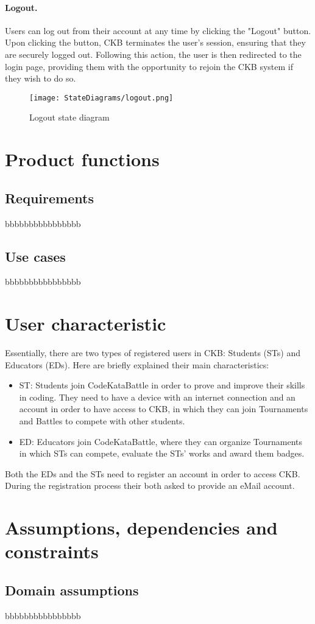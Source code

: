 \paragraph{Logout.}
Users can log out from their account at any time by clicking the "Logout" button. Upon clicking the button, CKB terminates the user's session, ensuring that they are securely logged out. Following this action, the user is then redirected to the login page, providing them with the opportunity to rejoin the CKB system if they wish to do so. 

\begin{figure}[H]
    \begin{center}
        \texttt{[image: StateDiagrams/logout.png]}
        \caption{Logout state diagram}
        \label{fig:logout_sd}%
    \end{center}
\end{figure}

\section{Product functions}
\label{sec:product_functions}%

\subsection{Requirements}
\label{subsec:requirements}%
bbbbbbbbbbbbbbbb

\subsection{Use cases}
\label{subsec:use_cases}%
bbbbbbbbbbbbbbbb

\section{User characteristic}
\label{sec:user_characteristic}%
Essentially, there are two types of registered users in CKB: Students (STs) and Educators (EDs). Here are briefly explained their main characteristics:
\begin{itemize}
    \item ST: Students join CodeKataBattle in order to prove and improve their skills in coding. They need to have a device with an internet connection and an account in order to have access to CKB, in which they can join Tournaments and Battles to compete with other students.  
    \item ED: Educators join CodeKataBattle, where they can organize Tournaments in which STs can compete, evaluate the STs’ works and award them badges. 
\end{itemize}
Both the EDs and the STs need to register an account in order to access CKB. During the registration process their both asked to provide an eMail account.
\section{Assumptions, dependencies and constraints}
\label{sec:assumptions_dependencies_constraints}%

\subsection{Domain assumptions}
\label{subsec:domain_assumptions}%
bbbbbbbbbbbbbbbb
